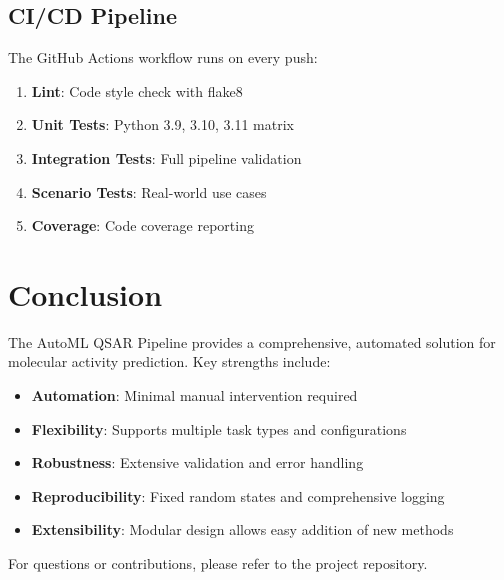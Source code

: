 \documentclass[11pt,a4paper]{article}
\begin{document}
\subsection{CI/CD Pipeline}

The GitHub Actions workflow runs on every push:

\begin{enumerate}
    \item \textbf{Lint}: Code style check with flake8
    \item \textbf{Unit Tests}: Python 3.9, 3.10, 3.11 matrix
    \item \textbf{Integration Tests}: Full pipeline validation
    \item \textbf{Scenario Tests}: Real-world use cases
    \item \textbf{Coverage}: Code coverage reporting
\end{enumerate}

\section{Conclusion}

The AutoML QSAR Pipeline provides a comprehensive, automated solution for molecular activity prediction. Key strengths include:

\begin{itemize}
    \item \textbf{Automation}: Minimal manual intervention required
    \item \textbf{Flexibility}: Supports multiple task types and configurations
    \item \textbf{Robustness}: Extensive validation and error handling
    \item \textbf{Reproducibility}: Fixed random states and comprehensive logging
    \item \textbf{Extensibility}: Modular design allows easy addition of new methods
\end{itemize}

For questions or contributions, please refer to the project repository.
\end{document}
